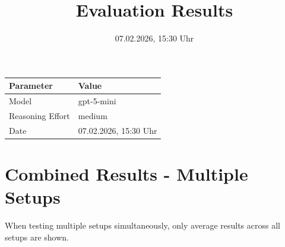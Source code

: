 \documentclass[a4paper,11pt]{article}
\title{Evaluation Results}
\date{07.02.2026, 15:30 Uhr}
\begin{document}
\maketitle

\begin{table}[H]
\centering
\begin{tabular}{l l}
\toprule
\textbf{Parameter} & \textbf{Value} \\
\midrule
Model & gpt-5-mini \\
Reasoning Effort & medium \\
Date & 07.02.2026, 15:30 Uhr \\
\bottomrule
\end{tabular}
\end{table}

\tableofcontents
\clearpage

\section{Combined Results - Multiple Setups}

When testing multiple setups simultaneously, only average results across all setups are shown.
\end{document}
